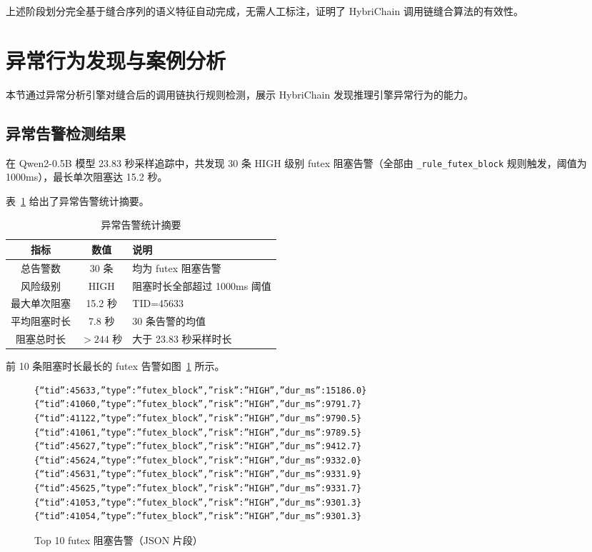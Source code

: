 上述阶段划分完全基于缝合序列的语义特征自动完成，无需人工标注，证明了 HybriChain 调用链缝合算法的有效性。

\section{异常行为发现与案例分析}

本节通过异常分析引擎对缝合后的调用链执行规则检测，展示 HybriChain 发现推理引擎异常行为的能力。

\subsection{异常告警检测结果}

在 Qwen2-0.5B 模型 23.83 秒采样追踪中，共发现 30 条 HIGH 级别 futex 阻塞告警（全部由 \texttt{\_rule\_futex\_block} 规则触发，阈值为 1000ms），最长单次阻塞达 15.2 秒。

表~\ref{tab:alert_summary} 给出了异常告警统计摘要。

\begin{table}[H]
    \centering
    \caption{异常告警统计摘要}
    \label{tab:alert_summary}
    \begin{tabular}{|c|c|p{7.5cm}|}
        \hline
        \textbf{指标} & \textbf{数值} & \textbf{说明} \\
        \hline
        总告警数 & 30 条 & 均为 futex 阻塞告警 \\
        \hline
        风险级别 & HIGH & 阻塞时长全部超过 1000ms 阈值 \\
        \hline
        最大单次阻塞 & 15.2 秒 & TID=45633 \\
        \hline
        平均阻塞时长 & 7.8 秒 & 30 条告警的均值 \\
        \hline
        阻塞总时长 & $> 244$ 秒 & 大于 23.83 秒采样时长 \\
        \hline
    \end{tabular}
\end{table}

前 10 条阻塞时长最长的 futex 告警如图~\ref{fig:alerts} 所示。

\begin{figure}[H]
\begin{minipage}{\textwidth}
\begin{lstlisting}
{“tid”:45633,”type”:”futex_block”,”risk”:”HIGH”,”dur_ms”:15186.0}
{“tid”:41060,”type”:”futex_block”,”risk”:”HIGH”,”dur_ms”:9791.7}
{“tid”:41122,”type”:”futex_block”,”risk”:”HIGH”,”dur_ms”:9790.5}
{“tid”:41061,”type”:”futex_block”,”risk”:”HIGH”,”dur_ms”:9789.5}
{“tid”:45627,”type”:”futex_block”,”risk”:”HIGH”,”dur_ms”:9412.7}
{“tid”:45624,”type”:”futex_block”,”risk”:”HIGH”,”dur_ms”:9332.0}
{“tid”:45631,”type”:”futex_block”,”risk”:”HIGH”,”dur_ms”:9331.9}
{“tid”:45625,”type”:”futex_block”,”risk”:”HIGH”,”dur_ms”:9331.7}
{“tid”:41053,”type”:”futex_block”,”risk”:”HIGH”,”dur_ms”:9301.3}
{“tid”:41054,”type”:”futex_block”,”risk”:”HIGH”,”dur_ms”:9301.3}
\end{lstlisting}
\caption{Top 10 futex 阻塞告警（JSON 片段）}
\label{fig:alerts}
\end{minipage}
\end{figure}

